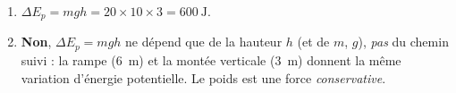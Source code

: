\documentclass[11pt,a4paper]{article}
\begin{document}
\begin{corrige}
\begin{enumerate}[label=\alph*)]
  \item $\Delta E_p=mgh=20\times10\times3=\qty{600}{\joule}$.
  \item \textbf{Non}, $\Delta E_p=mgh$ ne dépend que de la hauteur $h$ (et de $m$, $g$), \emph{pas} du
        chemin suivi : la rampe (\qty{6}{\metre}) et la montée verticale (\qty{3}{\metre}) donnent la
        même variation d'énergie potentielle. Le poids est une force \emph{conservative}.
\end{enumerate}
\end{corrige}
\end{document}
